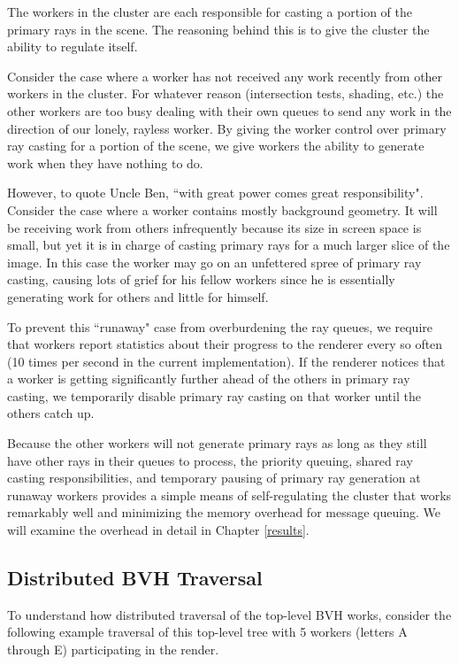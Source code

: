 \documentclass[12pt]{ucthesis}
\begin{document}
The workers in the cluster are each responsible for casting a portion of the
primary rays in the scene. The reasoning behind this is to give the cluster
the ability to regulate itself.

Consider the case where a worker has not received any work recently from other
workers in the cluster. For whatever reason (intersection tests, shading, etc.)
the other workers are too busy dealing with their own queues to send any work
in the direction of our lonely, rayless worker. By giving the worker control
over primary ray casting for a portion of the scene, we give workers the ability
to generate work when they have nothing to do.

However, to quote Uncle Ben, ``with great power comes great
responsibility". Consider the case where a worker contains mostly background
geometry. It will be receiving work from others infrequently because its size
in screen space is small, but yet it is in charge of casting primary rays for
a much larger slice of the image. In this case the worker may go on an
unfettered spree of primary ray casting, causing lots of grief for his fellow
workers since he is essentially generating work for others and little for
himself.

To prevent this ``runaway" case from overburdening the ray queues, we require
that workers report statistics about their progress to the renderer every so
often (10 times per second in the current implementation). If the renderer
notices that a worker is getting significantly further ahead of the others in
primary ray casting, we temporarily disable primary ray casting on that worker
until the others catch up.

Because the other workers will not generate primary rays as long as they still
have other rays in their queues to process, the priority queuing, shared
ray casting responsibilities, and temporary pausing of primary ray generation at
runaway workers provides a simple means of self-regulating the cluster that
works remarkably well and minimizing the memory overhead for message queuing.
We will examine the overhead in detail in Chapter \ref{results}.

\subsection{Distributed BVH Traversal}
\label{traversal}

To understand how distributed traversal of the top-level BVH works, consider
the following example traversal of this top-level tree with 5 workers (letters
A through E) participating in the render.
\end{document}
